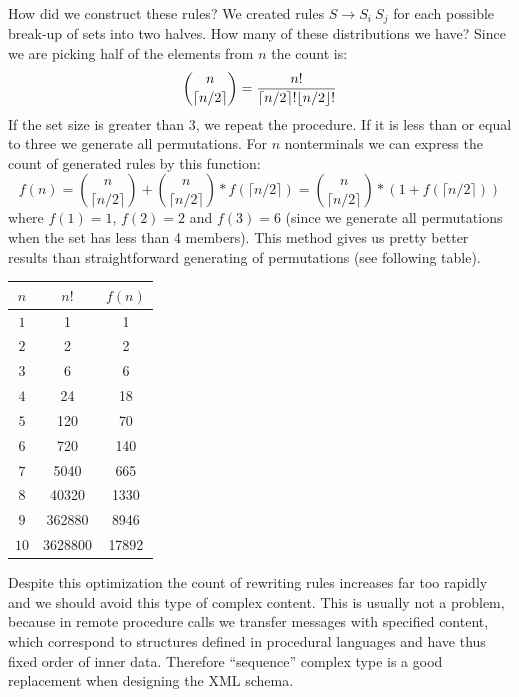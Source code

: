 \documentclass[12pt,notitlepage]{report}
\begin{document}
How did we construct these rules? We created rules $S \rightarrow S_{i}~S_{j}$ for each possible break-up of sets into two halves. How many of these distributions we have? Since we are picking half of the elements from $n$ the count is: \[{{n}\choose{\lceil n/2 \rceil}} = {{n!}\over{\lceil n/2 \rceil!\lfloor n/2 \rfloor!}}\] If the set size is greater than 3, we repeat the procedure. If it is less than or equal to three we generate all permutations. For $n$ nonterminals we can express the count of generated rules by this function: \[f(n) = {{n}\choose{\lceil n/2 \rceil}} + {{n}\choose{\lceil n/2 \rceil}} * f(\lceil n/2 \rceil) = {{n}\choose{\lceil n/2 \rceil}} * (1 + f(\lceil n/2 \rceil))\] where $f(1) = 1$, $f(2) = 2$ and $f(3) = 6$ (since we generate all permutations when the set has less than 4 members). This method gives us pretty better results than straightforward generating of permutations (see following table).

\begin{center}
\setlength{\tabcolsep}{0.5cm}
\renewcommand{\arraystretch}{1.3}
\begin{tabular}{|c|c|c|}
\hline
$n$ & $n!$ & $f(n)$ \\ \hline
$1$ & 1 & 1 \\ \hline
$2$ & 2 & 2 \\ \hline
$3$ & 6 & 6 \\ \hline
$4$ & 24 & 18 \\ \hline
$5$ & 120 & 70 \\ \hline
$6$ & 720 & 140 \\ \hline
$7$ & 5040 & 665 \\ \hline
$8$ & 40320 & 1330 \\ \hline
$9$ & 362880 & 8946 \\ \hline
$10$ & 3628800 & 17892 \\ \hline
\end{tabular}
\end{center}

Despite this optimization the count of rewriting rules increases far too rapidly and we should avoid this type of complex content. This is usually not a problem, because in remote procedure calls we transfer messages with specified content, which correspond to structures defined in procedural languages and have thus fixed order of inner data. Therefore ``sequence'' complex type is a good replacement when designing the XML schema.
\end{document}
